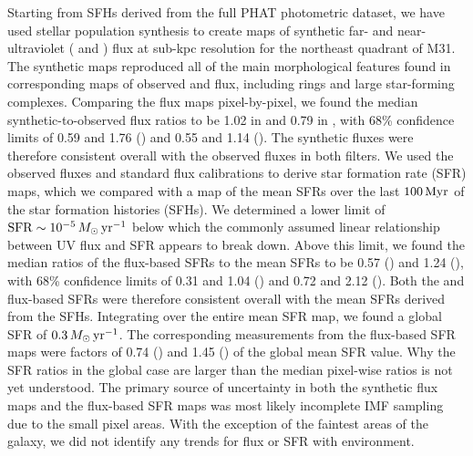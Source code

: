 Starting from SFHs derived from the full PHAT photometric dataset, we have used
stellar population synthesis to create maps of synthetic far- and
near-ultraviolet (\fuv{} and \nuv{}) flux at sub-kpc resolution for the
northeast quadrant of M31. The synthetic maps reproduced all of the main
morphological features found in corresponding maps of observed \fuv{} and
\nuv{} flux, including rings and large star-forming complexes. Comparing the
flux maps pixel-by-pixel, we found the median synthetic-to-observed flux ratios
to be 1.02 in \fuv{} and 0.79 in \nuv{}, with 68\% confidence limits of 0.59
and 1.76 (\fuv{}) and 0.55 and 1.14 (\nuv{}). The synthetic fluxes were
therefore consistent overall with the observed fluxes in both filters. We used
the observed fluxes and standard flux calibrations to derive star formation
rate (SFR) maps, which we compared with a map of the mean SFRs over the last
$100\,\mathrm{Myr}$ of the star formation histories (SFHs). We determined a lower limit
of $\mathrm{SFR} \sim 10^{-5}\,M_\odot\,\mathrm{yr}^{-1}$ below which the commonly assumed linear
relationship between UV flux and SFR appears to break down. Above this limit,
we found the median ratios of the flux-based SFRs to the mean SFRs to be 0.57
(\fuv{}) and 1.24 (\nuv{}), with 68\% confidence limits of 0.31 and 1.04
(\fuv{}) and 0.72 and 2.12 (\nuv{}). Both the \fuv{} and \nuv{} flux-based SFRs
were therefore consistent overall with the mean SFRs derived from the SFHs.
Integrating over the entire mean SFR map, we found a global SFR of
$0.3\,M_\odot\,\mathrm{yr}^{-1}$. The corresponding measurements from the flux-based SFR maps
were factors of 0.74 (\fuv{}) and 1.45 (\nuv{}) of the global mean SFR value.
Why the SFR ratios in the global case are larger than the median pixel-wise
ratios is not yet understood. The primary source of uncertainty in both the
synthetic flux maps and the flux-based SFR maps was most likely incomplete IMF
sampling due to the small pixel areas. With the exception of the faintest areas
of the galaxy, we did not identify any trends for flux or SFR with environment.
